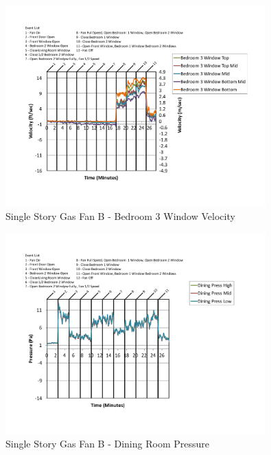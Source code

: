 \documentclass{article}
\begin{document}
\begin{appendices}
	\begin{figure}[H]
		\centering
		\includegraphics[height=3.05in,trim=0.67in 1.1in 0.67in 0.8in,clip=true]{0_Images/Results_Charts/ColdFlow/Single_Story/Gas/B/Bedroom_3_Window_Velocity.pdf}
		\caption{Single Story Gas Fan B - Bedroom 3 Window Velocity}
	\end{figure}
 

	\begin{figure}[H]
		\centering
		\includegraphics[height=3.05in,trim=0.67in 1.1in 0.67in 0.8in,clip=true]{0_Images/Results_Charts/ColdFlow/Single_Story/Gas/B/Dining_Room_Pressure.pdf}
		\caption{Single Story Gas Fan B - Dining Room Pressure}
	\end{figure}
 
	\clearpage


\end{appendices}
\end{document}

